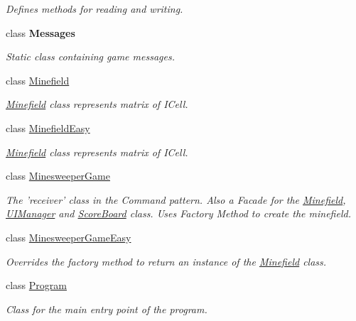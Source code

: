 \begin{DoxyCompactItemize}
\begin{DoxyCompactList}\small\item\em Defines methods for reading and writing. \end{DoxyCompactList}\item 
class {\bfseries Messages}
\begin{DoxyCompactList}\small\item\em Static class containing game messages. \end{DoxyCompactList}\item 
class \hyperlink{class_minesweeper_1_1_game_1_1_minefield}{Minefield}
\begin{DoxyCompactList}\small\item\em \hyperlink{class_minesweeper_1_1_game_1_1_minefield}{Minefield} class represents matrix of I\+Cell. \end{DoxyCompactList}\item 
class \hyperlink{class_minesweeper_1_1_game_1_1_minefield_easy}{Minefield\+Easy}
\begin{DoxyCompactList}\small\item\em \hyperlink{class_minesweeper_1_1_game_1_1_minefield}{Minefield} class represents matrix of I\+Cell. \end{DoxyCompactList}\item 
class \hyperlink{class_minesweeper_1_1_game_1_1_minesweeper_game}{Minesweeper\+Game}
\begin{DoxyCompactList}\small\item\em The 'receiver' class in the Command pattern. Also a Facade for the \hyperlink{class_minesweeper_1_1_game_1_1_minefield}{Minefield}, \hyperlink{class_minesweeper_1_1_game_1_1_u_i_manager}{U\+I\+Manager} and \hyperlink{class_minesweeper_1_1_game_1_1_score_board}{Score\+Board} class. Uses Factory Method to create the minefield. \end{DoxyCompactList}\item 
class \hyperlink{class_minesweeper_1_1_game_1_1_minesweeper_game_easy}{Minesweeper\+Game\+Easy}
\begin{DoxyCompactList}\small\item\em Overrides the factory method to return an instance of the \hyperlink{class_minesweeper_1_1_game_1_1_minefield}{Minefield} class. \end{DoxyCompactList}\item 
class \hyperlink{class_minesweeper_1_1_game_1_1_program}{Program}
\begin{DoxyCompactList}\small\item\em Class for the main entry point of the program. \end{DoxyCompactList}\item 

\end{DoxyCompactItemize}
